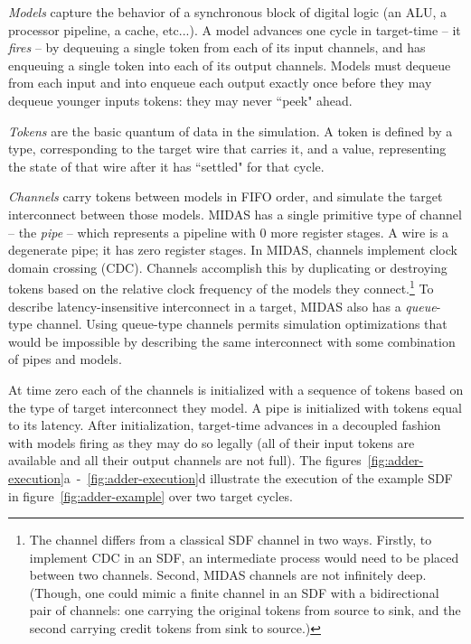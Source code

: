\emph{Models} capture the behavior of a synchronous block of digital logic (an
ALU, a processor pipeline, a cache, etc...). A model advances one cycle in
target-time -- it \emph{fires} -- by dequeuing a single token from each of its
input channels, and has enqueuing a single token into each of its output
channels.  Models must dequeue from each input and into enqueue each output
exactly once before they may dequeue younger inputs tokens: they may never
``peek" ahead.

\emph{Tokens} are the basic quantum of data in the simulation. A token is
defined by a type, corresponding to the target wire that carries it, and a
value, representing the state of that wire after it has ``settled" for that
cycle.

\emph{Channels} carry tokens between models in FIFO order, and simulate the
target interconnect between those models. MIDAS has a single primitive type of
channel --  the \emph{pipe} -- which represents a pipeline with 0 more register
stages. A wire is a degenerate pipe; it has zero register stages. In MIDAS,
channels implement clock domain crossing (CDC).  Channels accomplish this by
duplicating or destroying tokens based on the relative clock frequency of the
models they connect.\footnote{The channel differs from a classical SDF channel
in two ways.  Firstly, to implement CDC in an SDF, an intermediate process
would need to be placed between two channels. Second, MIDAS channels are not
infinitely deep.  (Though, one could mimic a finite channel in an SDF with a
bidirectional pair of channels: one carrying the original tokens from source to
sink, and the second carrying credit tokens from sink to source.)} To describe
latency-insensitive interconnect in a target, MIDAS also has a
\emph{queue}-type channel. Using queue-type channels permits simulation
optimizations that would be impossible by describing the same interconnect with
some combination of pipes and models.

At time zero each of the channels is initialized with a sequence of tokens based
on the type of target interconnect they model. A pipe is initialized with tokens
equal to its latency. After initialization, target-time advances in a decoupled
fashion with models firing as they may do so legally (all of their input tokens
are available and all their output channels are not full). The
figures~\ref{fig:adder-execution}a~-~\ref{fig:adder-execution}d illustrate the
execution of the example SDF in figure~\ref{fig:adder-example} over two target
cycles.

